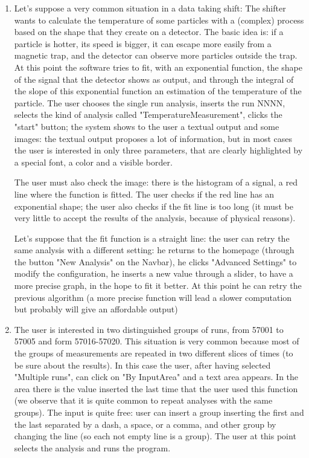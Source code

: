 \begin{enumerate}

\item
Let's suppose a very common situation in a data taking shift: 
The shifter wants to calculate the temperature of some particles with a (complex) process based on the shape that they create on a detector. The basic idea is: if a particle is hotter, its speed is bigger, it can escape more easily from a magnetic trap, and the detector can observe more particles outside the trap. At this point the software tries to fit, with an exponential function, the shape of the signal that the detector shows as output, and through the integral of the slope of this exponential function an estimation of the temperature of the particle.
The user chooses the single run analysis, inserts the run NNNN, selects the kind of analysis called "TemperatureMeasurement", clicks the "start" button;
the system shows to the user a textual output and some images: 
the textual output proposes a lot of information, but in most cases the user is interested in only three parameters, that are clearly highlighted by a special font, a color and a visible border. 

The user must also check the image: there is the histogram of a signal, a red line where the function is fitted. The user checks if the red line
has an exponential shape; the user also checks if the fit line is too long (it must be very little to accept the results of the analysis, because of physical reasons). 

Let's suppose that the fit function is a straight line: the user can retry the same analysis with a different setting: he returns to the homepage (through the button "New Analysis" on the Navbar), he clicks "Advanced Settings" to modify the configuration, he inserts a new value through a slider, to have a more precise graph, in the hope to fit it better. At this point he can retry the previous algorithm (a more precise function will lead a slower computation but probably will give an affordable output)  

\item 
The user is interested in two distinguished groups of runs, from 57001 to 57005 and form 57016-57020.
This situation is very common because most of the groups of measurements are repeated in two different slices of times (to be sure about the results).
In this case the user, after having selected "Multiple runs", can click on "By InputArea" and a text area appears. In the area there is the value inserted the last time that the user used this function (we observe that it is quite common to repeat analyses with the same groups). The input is quite free: user can insert a group inserting the first and the last separated by a dash, a space, or a comma, and other group by changing the line (so each not empty line is a group). 
The user at this point selects the analysis and runs the program. 


\end{enumerate}
